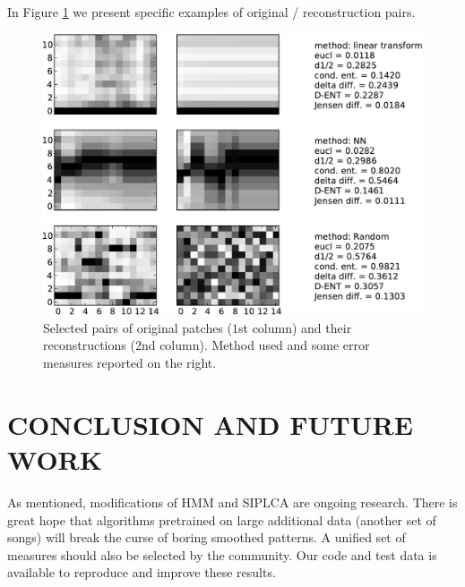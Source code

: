 \documentclass{article}
\begin{document}
In Figure \ref{fig:origrecon} we present specific examples of
original / reconstruction pairs.

\begin{figure}[t]
\begin{center}
\includegraphics[width=.9\columnwidth]{original_recons}
\end{center}
\caption{Selected pairs of original patches ($1$st column)
and their reconstructions ($2$nd column). 
Method used and some error measures
reported on the right.
\label{fig:origrecon}}
\end{figure}

\section{CONCLUSION AND FUTURE WORK}
\label{sec:conclusion}
As mentioned, modifications of HMM and SIPLCA are ongoing
research. There is great hope that algorithms pretrained
on large additional data (another set of songs) will break
the curse of boring smoothed patterns.
A unified set of measures should also be selected
by the community. Our code and test data is available to 
reproduce and improve these results.








\end{document}
